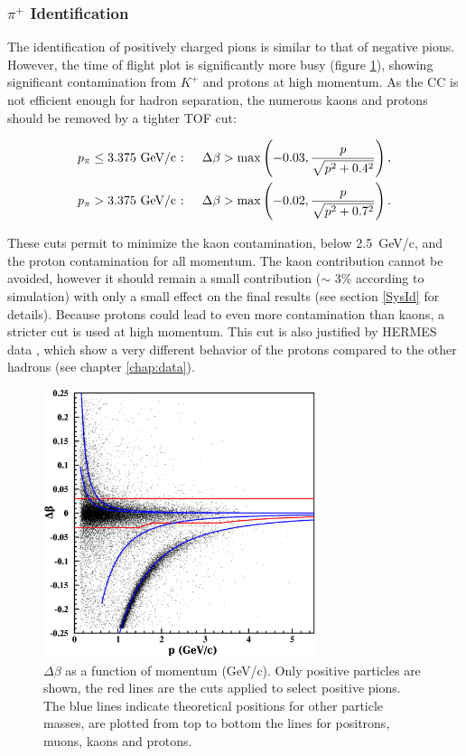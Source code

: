 \subsubsection{$\pi^+$ Identification}

The identification of positively charged pions is similar to that of negative 
pions. However, the time of flight plot is significantly more busy (figure 
\ref{PipTOF}), showing significant contamination from $K^+$ and protons at 
high momentum. As the CC is not efficient enough for hadron separation, the 
numerous kaons and protons should be removed by a tighter TOF cut:

\begin{subequations}\label{TOF-Pip}
\begin{align}
    p_\pi &\leq 3.375 \text{ GeV/c : }
  & \Delta \beta &> \max\left(-0.03,{p \over\sqrt{p^2+0.4^2}}\right), \\ 
    p_\pi &> 3.375    \text{ GeV/c : }
  & \Delta \beta &> \max\left(-0.02,{p \over\sqrt{p^2+0.7^2}}\right).
\end{align}
\end{subequations}

These cuts permit to minimize the kaon contamination, below 2.5~GeV/c, and the 
proton contamination for all momentum. The kaon contribution cannot be avoided, however 
it should remain a small contribution ($\sim$ 3\% according to simulation) 
with only a small effect on the final results (see section \ref{SysId} 
for details). Because protons could lead to even more contamination than kaons, 
a stricter cut is used at high momentum. This cut is also justified by 
HERMES data \cite{Airapetian:2007vu}, which show a very 
different behavior of the protons compared to the other hadrons (see chapter \ref{chap:data}).

\begin{figure}[tbp]
\centering
\includegraphics[width=8cm] {chap5-fig/pip_data.png} 
\caption {$\Delta \beta$ as a 
function of momentum (GeV/c). Only positive particles are shown, the red 
lines are the cuts applied to select positive pions. The blue lines indicate 
theoretical positions for other particle masses, are plotted from top to 
bottom the lines for positrons, muons, kaons and protons.}
\label{PipTOF}
\end{figure}

